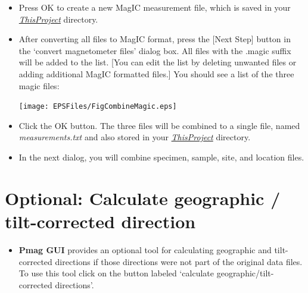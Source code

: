 \documentclass[11pt]{book}
\begin{document}
{{\begin{itemize}
Your dialog boxes should look like this for the AF and thermal data:

\texttt{[image: EPSFiles/FigConvertGenericA.eps]}

and like this for the  paleointensity data.  For paleointensity data, you must also supply the lab field in micro tesla (40) and orientation relative to sample's X direction:  0 -90.

\texttt{[image: EPSFiles/FigConvertGenericB.eps]}

\item Press OK to create a new MagIC measurement file, which is saved in your \href{#Project_Directory}{\it ThisProject} directory.



\item After converting all files to MagIC format, press the [Next Step] button in the `convert magnetometer files' dialog box. All files with the .magic suffix will be added to the list.  [You can edit the list by deleting unwanted files or adding additional MagIC formatted files.]   You should see a list of the three magic files:

\texttt{[image: EPSFiles/FigCombineMagic.eps]}

\item Click the OK button. The three files will be combined to a single file,  named {\it measurements.txt} and also stored  in your \href{#Project_Directory}{\it ThisProject} directory.

\item In the next dialog, you will combine specimen, sample, site, and location files.
\end{itemize}


\section{Optional: Calculate geographic / tilt-corrected direction}
\begin{itemize}
\item {\bf Pmag GUI} provides an optional tool for calculating geographic and tilt-corrected directions if those directions were not part of the original data files. To use this tool click on the button labeled `calculate geographic/tilt-corrected directions'.


\end{itemize}}}
\end{document}
